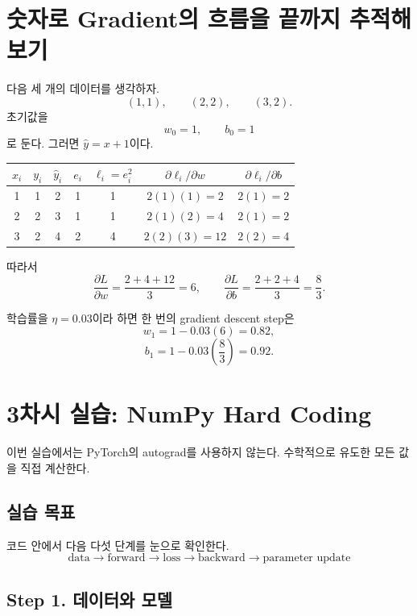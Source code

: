 \documentclass[11pt,a4paper]{article}
\begin{document}
\section{숫자로 Gradient의 흐름을 끝까지 추적해 보기}

다음 세 개의 데이터를 생각하자.
\[
(1,1),\qquad(2,2),\qquad(3,2).
\]
초기값을
\[
w_0=1,\qquad b_0=1
\]
로 둔다. 그러면 $\widehat y=x+1$이다.

\begin{center}
\begin{tabular}{c|c|c|c|c|c|c}
\toprule
$x_i$ & $y_i$ & $\widehat y_i$ & $e_i$ & $\ell_i=e_i^2$ & $\partial\ell_i/\partial w$ & $\partial\ell_i/\partial b$\\
\midrule
1 & 1 & 2 & 1 & 1 & $2(1)(1)=2$ & $2(1)=2$\\
2 & 2 & 3 & 1 & 1 & $2(1)(2)=4$ & $2(1)=2$\\
3 & 2 & 4 & 2 & 4 & $2(2)(3)=12$ & $2(2)=4$\\
\bottomrule
\end{tabular}
\end{center}

따라서
\[
\frac{\partial L}{\partial w}
=
\frac{2+4+12}{3}=6,
\qquad
\frac{\partial L}{\partial b}
=
\frac{2+2+4}{3}=\frac{8}{3}.
\]

학습률을 $\eta=0.03$이라 하면 한 번의 gradient descent step은
\[
w_1=1-0.03(6)=0.82,
\]
\[
b_1=1-0.03\left(\frac83\right)=0.92.
\]

\section{3차시 실습: NumPy Hard Coding}

이번 실습에서는 PyTorch의 autograd를 사용하지 않는다.
수학적으로 유도한 모든 값을 직접 계산한다.

\subsection{실습 목표}

코드 안에서 다음 다섯 단계를 눈으로 확인한다.
\[
\boxed{
\text{data}
\rightarrow
\text{forward}
\rightarrow
\text{loss}
\rightarrow
\text{backward}
\rightarrow
\text{parameter update}
}
\]

\subsection{Step 1. 데이터와 모델}
\end{document}

